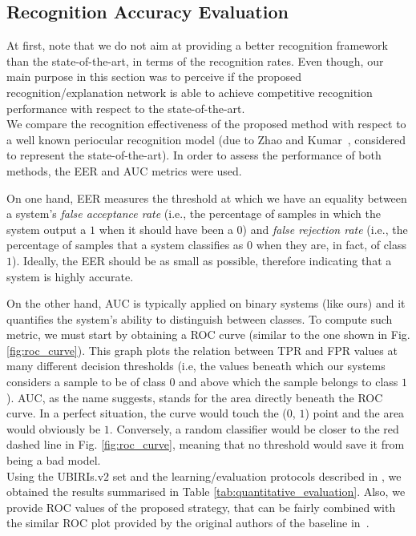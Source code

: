 \subsection{Recognition Accuracy Evaluation}
\label{subsec:chap4_recognition_accuracy_evaluation}

At first, note that we do not aim at providing a better recognition framework than the state-of-the-art, in terms of the recognition rates.  Even though, our main purpose in this section was to perceive if the proposed recognition/explanation network is able to achieve competitive recognition performance with respect to the state-of-the-art.\\

We compare the recognition effectiveness of the proposed method with respect to a well known periocular recognition model (due to Zhao and Kumar~\cite{accurate_periocular_recognition},  considered to represent the state-of-the-art). In order to assess the performance of both methods, the \ac{EER} and \ac{AUC} metrics were used.

On one hand, \ac{EER} measures the threshold at which we have an equality between a system's \textit{false acceptance rate} (i.e., the percentage of samples in which the system output a $1$ when it should have been a $0$) and \textit{false rejection rate} (i.e., the percentage of samples that a system classifies as $0$ when they are, in fact, of class $1$). Ideally, the \ac{EER} should be as small as possible, therefore indicating that a system is highly accurate.

On the other hand, \ac{AUC} is typically applied on binary systems (like ours) and it quantifies the system's ability to distinguish between classes. To compute such metric, we must start by obtaining a \ac{ROC} curve (similar to the one shown in Fig. \ref{fig:roc_curve}). This graph plots the relation between \ac{TPR} and \ac{FPR} values at many different decision thresholds (i.e, the values beneath which our systems considers a sample to be of class $0$ and above which the sample belongs to class $1$). \ac{AUC}, as the name suggests, stands for the area directly beneath the \ac{ROC} curve. In a perfect situation, the curve would touch the  ($0$, $1$) point and the area would obviously be $1$. Conversely, a random classifier would be closer to the red dashed line in Fig. \ref{fig:roc_curve}, meaning that no threshold would save it from being a bad model.\\

Using the UBIRIs.v$2$ set \cite{ubiris_v2} and the learning/evaluation protocols described in \cite{accurate_periocular_recognition}, we obtained the results summarised in Table \ref{tab:quantitative_evaluation}. Also, we provide \ac{ROC} values of the proposed strategy, that can be fairly combined with the similar \ac{ROC} plot provided by the original authors of the baseline in~\cite{zhao_kumar_novel}.

